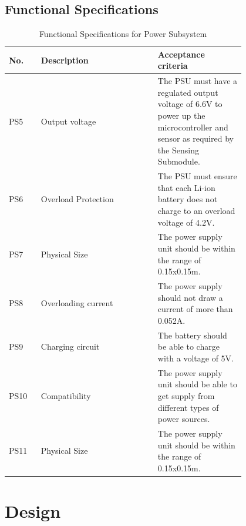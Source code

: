 \documentclass[class=report,11pt,crop=false]{standalone}
\begin{document}
	\subsection{Functional Specifications}
	\begin{table}[h!]
		\centering
		\caption{Functional Specifications for Power Subsystem}
		\label{tab:P2}
		\begin{tabularx}{0.8\textwidth}{|>{\centering\arraybackslash}m{0.1\linewidth}|>{\centering\arraybackslash}m{0.4\linewidth}|>{\centering\arraybackslash}m{0.3\linewidth}|}
			\hline
			\textbf{No.} & \textbf{Description} & \textbf{Acceptance criteria} \\
			\hline
			PS5 & Output voltage & The PSU must have a regulated output voltage of 6.6V to power up the microcontroller and sensor as required by the Sensing Submodule. \\
			\hline
			PS6 & Overload Protection & The PSU must ensure that each Li-ion battery does not charge to an overload voltage of 4.2V. \\
			\hline
			PS7 & Physical Size & The power supply unit should be within the range of 0.15x0.15m. \\
			\hline
			PS8 & Overloading current & The power supply should not draw a current of more than 0.052A. \\
			\hline
			PS9 & Charging circuit & The battery should be able to charge with a voltage of 5V. \\
			\hline
			PS10 & Compatibility & The power supply unit should be able to get supply from different types of power sources. \\
			\hline
			PS11 & Physical Size & The power supply unit should be within the range of 0.15x0.15m. \\
			\hline
		\end{tabularx}
	\end{table}
	
	\section{Design}
\end{document}
